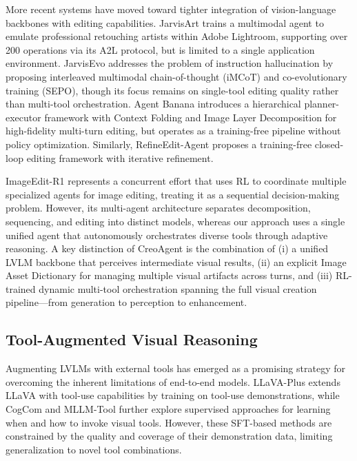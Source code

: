 \documentclass{article}
\begin{document}
More recent systems have moved toward tighter integration of vision-language backbones with editing capabilities. JarvisArt \cite{lin2025jarvisart} trains a multimodal agent to emulate professional retouching artists within Adobe Lightroom, supporting over 200 operations via its A2L protocol, but is limited to a single application environment. JarvisEvo \cite{lin2025jarvisevo} addresses the problem of instruction hallucination by proposing interleaved multimodal chain-of-thought (iMCoT) and co-evolutionary training (SEPO), though its focus remains on single-tool editing quality rather than multi-tool orchestration. Agent Banana \cite{ye2026agentbanana} introduces a hierarchical planner-executor framework with Context Folding and Image Layer Decomposition for high-fidelity multi-turn editing, but operates as a training-free pipeline without policy optimization. Similarly, RefineEdit-Agent \cite{refineedit2025} proposes a training-free closed-loop editing framework with iterative refinement.

ImageEdit-R1 \cite{zhao2026imageditr1} represents a concurrent effort that uses RL to coordinate multiple specialized agents for image editing, treating it as a sequential decision-making problem. However, its multi-agent architecture separates decomposition, sequencing, and editing into distinct models, whereas our approach uses a single unified agent that autonomously orchestrates diverse tools through adaptive reasoning. A key distinction of CreoAgent is the combination of (i) a unified LVLM backbone that perceives intermediate visual results, (ii) an explicit Image Asset Dictionary for managing multiple visual artifacts across turns, and (iii) RL-trained dynamic multi-tool orchestration spanning the full visual creation pipeline—from generation to perception to enhancement.

\subsection{Tool-Augmented Visual Reasoning}

Augmenting LVLMs with external tools has emerged as a promising strategy for overcoming the inherent limitations of end-to-end models. LLaVA-Plus \cite{liu2024llavaplus} extends LLaVA with tool-use capabilities by training on tool-use demonstrations, while CogCom \cite{qi2024cogcom} and MLLM-Tool \cite{wang2024mllmtool} further explore supervised approaches for learning when and how to invoke visual tools. However, these SFT-based methods are constrained by the quality and coverage of their demonstration data, limiting generalization to novel tool combinations.
\end{document}

